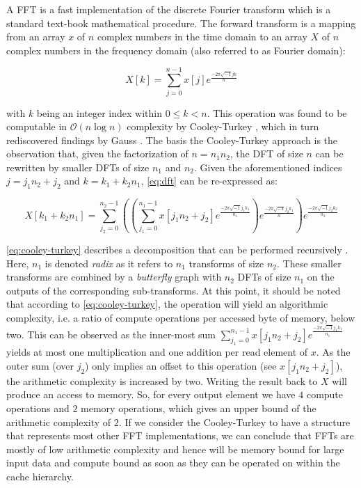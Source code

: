 A FFT is a fast implementation of the discrete Fourier transform which is a standard text-book mathematical procedure. The forward transform is a mapping from an array $x$ of $n$ complex numbers in the time domain to an array $X$ of $n$ complex numbers in the frequency domain (also referred to as Fourier domain):

\begin{equation}
  \label{eq:dft}
  X[k] = \sum_{j=0}^{n-1} x[j]e^{\frac{-2\pi\sqrt{-1}jk}{n}}
\end{equation}

with $k$ being an integer index within $0 \le k < n$. This operation was found to be computable in $\mathcal{O}(n \log n)$ complexity by Cooley-Turkey \cite{cooley1965algorithm}, which in turn rediscovered findings by Gauss \cite{gauss}. The basis the Cooley-Turkey approach is the observation that, given the factorization of $n=n_1n_2$, the  DFT of size $n$ can be rewritten by smaller DFTs of size $n_1$ and $n_2$. Given the aforementioned indices $j=j_1n_2 + j_2$ and $k=k_1+k_2n_1$, \cref{eq:dft} can be re-expressed as:

\begin{equation}
  \label{eq:cooley-turkey}
  X[k_1 + k_2n_1] = \sum_{j_2=0}^{n_2-1} \left( \left( \sum_{j_1=0}^{n_1-1} x[j_1n_2 + j_2] e^{\frac{-2\pi\sqrt{-1}j_1k_1}{n_1}} \right) e^{\frac{-2\pi\sqrt{-1}j_2k_1}{n}} \right) e^{\frac{-2\pi\sqrt{-1}j_2k_2}{n_2}}
\end{equation}

\cref{eq:cooley-turkey} describes a decomposition that can be performed recursively \cite{FFTW05}. Here, $n_1$ is denoted \emph{radix} as it refers to $n_1$ transforms of size $n_2$. These smaller transforms are combined by a \emph{butterfly} graph with $n_2$ DFTs of size $n_1$ on the outputs of the corresponding sub-transforms. At this point, it should be noted that according to \cref{eq:cooley-turkey}, the operation will yield an algorithmic complexity, i.e. a ratio of compute operations per accessed byte of memory, below two. This can be observed as the inner-most sum $\sum_{j_1=0}^{n_1-1} x[j_1n_2 + j_2] e^{\frac{-2\pi\sqrt{-1}j_1k_1}{n_1}}$ yields at most one multiplication and one addition per read element of $x$. As the outer sum (over $j_2$) only implies an offset to this operation (see $x[j_1n_2 + j_2]$), the arithmetic complexity is increased by two. Writing the result back to $X$ will produce an access to memory. So, for every output element we have $4$ compute operations and $2$ memory operations, which gives an upper bound of the arithmetic complexity of $2$. If we consider the Cooley-Turkey to have a structure that represents most other FFT implementations, we can conclude that FFTs are mostly of low arithmetic complexity and hence will be memory bound for large input data and compute bound as soon as they can be operated on within the cache hierarchy.

